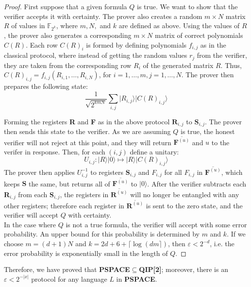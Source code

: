 \documentclass[12pt]{article}
\numberwithin{thm}{section}
\numberwithin{defn}{section}
\numberwithin{prop}{section}
\numberwithin{rmk}{section}
\newcommand{\ket}[1]{\vert #1 \rangle}
\begin{document}
	\begin{proof}
		First suppose that a given formula $Q$ is true. We want to show that the verifier accepts it with certainty. The prover also creates a random $m\times N$ matrix $R$ of values in $\mathbb{F}_{2^k}$, where $m,N,$ and $k$ are defined as above. Using the values of $R$, the prover also generates a corresponding $m\times N$ matrix of correct polynomials $C(R)$. Each row $C(R)_i$ is formed by defining polynomials $f_{i,j}$ as in the classical protocol, where instead of getting the random values $r_j$ from the verifier, they are taken from the corresponding row $R_i$ of the generated matrix $R$. Thus, $C(R)_{i,j}=f_{i,j}(R_{i,1},\dots,R_{i,N})$, for $i=1,\dots,m,j=1,\dots,N$. The prover then prepares the following state:
		\[\frac{1}{\sqrt{2^{kmN}}}\sum_{i,j}\ket{R_{i,j}}\ket{C(R)_{i,j}}\]
		
		Forming the registers \textbf{R} and \textbf{F} as in the above protocol $\textbf{R}_{i,j}$ to $\textbf{S}_{i,j}$. The prover then sends this state to the verifier. As we are assuming $Q$ is true, the honest verifier will not reject at this point, and they will return $\overline{\textbf{F}^{(u)}}$ and $u$ to the verifer in response. Then, for each $(i,j)$ define a unitary:
		\[U_{i,j}:\ket{R}\ket{0}\mapsto\ket{R}\ket{C(R)_{i,j}}\]
		The prover then applies $U_{i,j}^{-1}$ to registers $\textbf{S}_{i,j}$ and $F_{i,j}$ for all $F_{i,j}$ in $\overline{\textbf{F}^{(u)}}$, which keeps $\textbf{S}$ the same, but returns all of $\overline{\textbf{F}^{(u)}}$ to $\ket{0}$. After the verifier subtracts each \textbf{R}$_{i,j}$ from each \textbf{S}$_{i,j}$, the registers in $\overline{\textbf{R}^{(u)}}$ will no longer be entangled with any other registers; therefore each register in $\overline{\textbf{R}^{(u)}}$ is sent to the zero state, and the verifier will accept $Q$ with certainty.\\
		In the case where $Q$ is not a true formula, the verifier will accept with some error probability. An upper bound for this probability is determined by $m$ and $k$. If we choose $m=(d+1)N$ and $k=2d+6+\lceil\log(dm\rceil)$, then $\varepsilon<2^{-d}$, i.e. the error probability is exponentially small in the length of $Q$.
	\end{proof}
	
	\noindent Therefore, we have proved that \textbf{PSPACE}$\subseteq$\textbf{QIP[2]}; moreover, there is an $\varepsilon<2^{-|x|}$ protocol for any language $L$ in \textbf{PSPACE}.  
\end{document}
